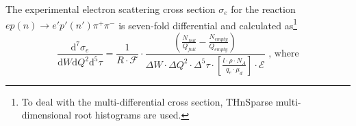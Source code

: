 The experimental electron scattering cross section $\sigma_{e}$ for the reaction $ep(n) \rightarrow e'p'(n') \pi^{+} \pi^{-}$ is seven-fold differential and calculated as\footnote[10]{To deal with the multi-differential cross section, THnSparse multi-dimensional root histograms are used.}\vspace{-0.5em}
\begin{equation}
\frac{\textrm{d}^{7}\sigma_{e}}{\textrm{d}W\textrm{d}Q^{2}\textrm{d}^{5}\tau} = \frac{1}{ R \! \cdot \! \mathcal{F}}  \cdot 
\frac{\left( \frac{N_{full}}{Q_{full}}-\frac{N_{empty}}{Q_{empty}} \right)}{
\Delta W \! \cdot \! \Delta Q^{2} \! \cdot \! \Delta^{5} \tau \! \cdot \! \left[ \frac{l \cdot \rho \cdot N_{A}}{q_{e}\cdot \mu_{d}} \right]\! \cdot \!\mathcal{E}} \textrm{ , where}
\label{expcrossect}
\end{equation}

